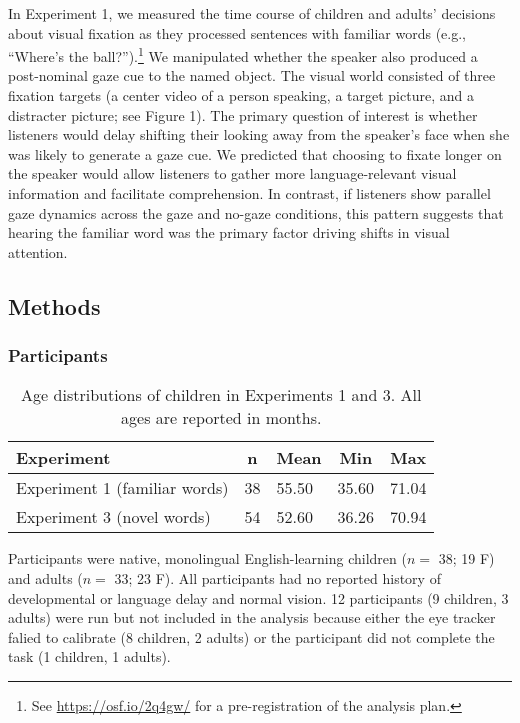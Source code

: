 \documentclass[oneside]{report}
\begin{document}
In Experiment 1, we measured the time course of children and adults'
decisions about visual fixation as they processed sentences with
familiar words (e.g., ``Where's the ball?'').\footnote{See
  \url{https://osf.io/2q4gw/} for a pre-registration of the analysis
  plan.} We manipulated whether the speaker also produced a post-nominal
gaze cue to the named object. The visual world consisted of three
fixation targets (a center video of a person speaking, a target picture,
and a distracter picture; see Figure 1). The primary question of
interest is whether listeners would delay shifting their looking away
from the speaker's face when she was likely to generate a gaze cue. We
predicted that choosing to fixate longer on the speaker would allow
listeners to gather more language-relevant visual information and
facilitate comprehension. In contrast, if listeners show parallel gaze
dynamics across the gaze and no-gaze conditions, this pattern suggests
that hearing the familiar word was the primary factor driving shifts in
visual attention.

\subsection{Methods}\label{methods-3}

\subsubsection{Participants}\label{participants-6}
\begin{table}[tbp]
\begin{center}
\begin{threeparttable}
\caption{\label{tab:make-ss-table}Age distributions of children in Experiments 1 and 3. All ages are reported in months.}
\begin{tabular}{lllll}
\toprule
Experiment & \multicolumn{1}{c}{n} & \multicolumn{1}{c}{Mean} & \multicolumn{1}{c}{Min} & \multicolumn{1}{c}{Max}\\
\midrule
Experiment 1 (familiar words) & 38 & 55.50 & 35.60 & 71.04\\
Experiment 3 (novel words) & 54 & 52.60 & 36.26 & 70.94\\
\bottomrule
\end{tabular}
\end{threeparttable}
\end{center}
\end{table}
Participants were native, monolingual English-learning children (\(n=\)
38; 19 F) and adults (\(n=\) 33; 23 F). All participants had no reported
history of developmental or language delay and normal vision. 12
participants (9 children, 3 adults) were run but not included in the
analysis because either the eye tracker falied to calibrate (8 children,
2 adults) or the participant did not complete the task (1 children, 1
adults).
\end{document}
